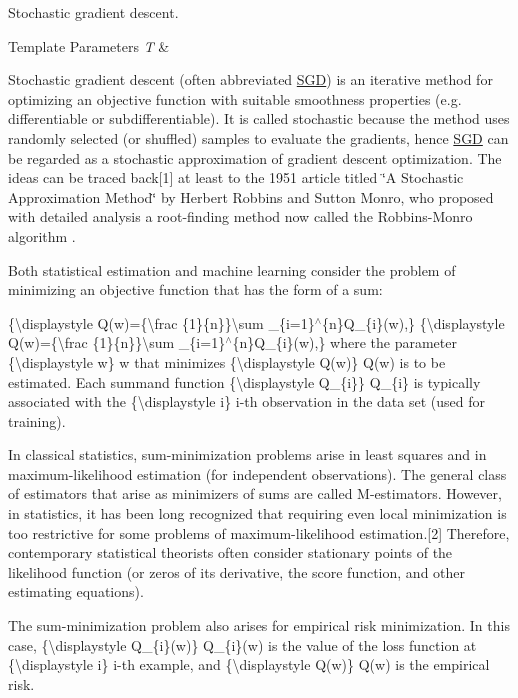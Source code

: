 Stochastic gradient descent. 


\begin{DoxyTemplParams}{Template Parameters}
{\em T} & \\
\hline
\end{DoxyTemplParams}
Stochastic gradient descent (often abbreviated \mbox{\hyperlink{class_s_g_d}{S\+GD}}) is an iterative method for optimizing an objective function with suitable smoothness properties (e.\+g. differentiable or subdifferentiable). It is called stochastic because the method uses randomly selected (or shuffled) samples to evaluate the gradients, hence \mbox{\hyperlink{class_s_g_d}{S\+GD}} can be regarded as a stochastic approximation of gradient descent optimization. The ideas can be traced back\mbox{[}1\mbox{]} at least to the 1951 article titled \char`\"{}\+A Stochastic Approximation Method\char`\"{} by Herbert Robbins and Sutton Monro, who proposed with detailed analysis a root-\/finding method now called the Robbins-\/\+Monro algorithm .

Both statistical estimation and machine learning consider the problem of minimizing an objective function that has the form of a sum\+:

\{\textbackslash{}displaystyle Q(w)=\{\textbackslash{}frac \{1\}\{n\}\}\textbackslash{}sum \+\_\+\{i=1\}$^\wedge$\{n\}Q\+\_\+\{i\}(w),\} \{\textbackslash{}displaystyle Q(w)=\{\textbackslash{}frac \{1\}\{n\}\}\textbackslash{}sum \+\_\+\{i=1\}$^\wedge$\{n\}Q\+\_\+\{i\}(w),\} where the parameter \{\textbackslash{}displaystyle w\} w that minimizes \{\textbackslash{}displaystyle Q(w)\} Q(w) is to be estimated. Each summand function \{\textbackslash{}displaystyle Q\+\_\+\{i\}\} Q\+\_\+\{i\} is typically associated with the \{\textbackslash{}displaystyle i\} i-\/th observation in the data set (used for training).

In classical statistics, sum-\/minimization problems arise in least squares and in maximum-\/likelihood estimation (for independent observations). The general class of estimators that arise as minimizers of sums are called M-\/estimators. However, in statistics, it has been long recognized that requiring even local minimization is too restrictive for some problems of maximum-\/likelihood estimation.\mbox{[}2\mbox{]} Therefore, contemporary statistical theorists often consider stationary points of the likelihood function (or zeros of its derivative, the score function, and other estimating equations).

The sum-\/minimization problem also arises for empirical risk minimization. In this case, \{\textbackslash{}displaystyle Q\+\_\+\{i\}(w)\} Q\+\_\+\{i\}(w) is the value of the loss function at \{\textbackslash{}displaystyle i\} i-\/th example, and \{\textbackslash{}displaystyle Q(w)\} Q(w) is the empirical risk.

